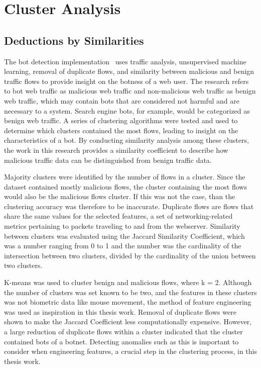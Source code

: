 
\section{Cluster Analysis}\label{sec:cluster-analysis}

\subsection{Deductions by Similarities}\label{subsec:deductions-by-similarities}
The bot detection implementation~\cite{bot_detection_wei_alvarez} uses traffic analysis, unsupervised machine learning, removal of duplicate flows, and similarity between malicious and benign traffic flows to provide insight on the botness of a web user.
The research refers to bot web traffic as malicious web traffic and non-malicious web traffic as benign web traffic, which may contain bots that are considered not harmful and are necessary to a system.
Search engine bots, for example, would be categorized as benign web traffic.
A series of clustering algorithms were tested and used to determine which clusters contained the most flows, leading to insight on the characteristics of a bot.
By conducting similarity analysis among these clusters, the work in this research provides a similarity coefficient to describe how malicious traffic data can be distinguished from benign traffic data.

Majority clusters were identified by the number of flows in a cluster.
Since the dataset contained mostly malicious flows, the cluster containing the most flows would also be the malicious flows cluster.
If this was not the case, than the clustering accuracy was therefore to be inaccurate.
Duplicate flows are flows that share the same values for the selected features, a set of networking-related metrics pertaining to packets traveling to and from the webserver.
Similarity between clusters was evaluated using the Jaccard Similarity Coefficient, which was a number ranging from 0 to 1 and the number was the cardinality of the intersection between two clusters, divided by the cardinality of the union between two clusters.

K-means was used to cluster benign and malicious flows, where k = 2.
Although the number of clusters was set known to be two, and the features in these clusters was not biometric data like mouse movement, the method of feature engineering was used as inspiration in this thesis work.
Removal of duplicate flows were shown to make the Jaccard Coefficient less computationally expensive.
However, a large reduction of duplicate flows within a cluster indicated that the cluster contained bots of a botnet.
Detecting anomalies such as this is important to consider when engineering features, a crucial step in the clustering process, in this thesis work.

